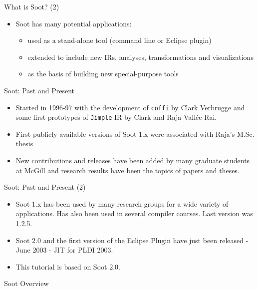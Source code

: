 \begin{slide}{What is Soot?  (2)}
\begin{itemize}
\item Soot has many potential applications:
\begin{itemize}
  \item used as a stand-alone tool (command line or Eclipse plugin)
  \item extended to include new IRs, analyses, transformations and 
        visualizations
  \item as the basis of building new special-purpose tools 
\end{itemize}
\end{itemize}
\end{slide}

\begin{slide}{Soot: Past and Present}
\begin{itemize}
\item Started in 1996-97 with the development of \texttt{coffi} by
Clark Verbrugge and some first prototypes of \texttt{Jimple} IR by
Clark and Raja Vall\'ee-Rai.
\item First publicly-available versions of Soot 1.x were associated 
with Raja's M.Sc. thesis
\item New contributions and releases have been added by many
graduate students at McGill and research results have been the topics
of papers and theses.
\end{itemize}
\end{slide}

\begin{slide}{Soot: Past and Present (2)}

\begin{itemize}
\item Soot 1.x has been used by many research groups for 
a wide variety of applications.   Has also been used in several
compiler courses.  Last version was 1.2.5.
\item Soot 2.0 and the first version of the Eclipse Plugin have just
been released - June 2003 - JIT for PLDI 2003.
\item This tutorial is based on Soot 2.0. 
\end{itemize}
\end{slide}

\begin{slide}{Soot Overview}
\end{slide}

